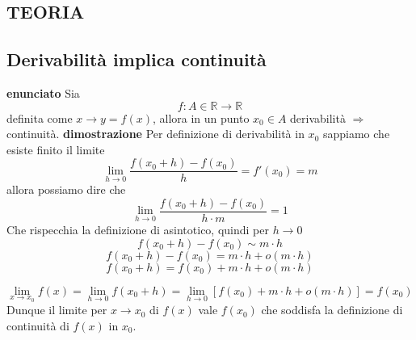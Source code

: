 \documentclass[a4paper, 9pt]{report}
\begin{document}
\newpage
\subsection*{TEORIA}
\subsection*{Derivabilità implica continuità}
\textbf{enunciato}\newline
Sia
\[
    f: A \in \mathbb{R} \rightarrow  \mathbb{R}
\]
definita come $x \longrightarrow y = f(x)$, allora in un punto $x_0 \in A$ derivabilità $\Rightarrow $ continuità. \newline
\textbf{dimostrazione}\newline
Per definizione di derivabilità in $x_0$ sappiamo che esiste finito il limite
\[
    \lim_{h\rightarrow 0}\frac{f(x_0 +h)- f(x_0)}{h} = f'(x_0) = m
\]
allora possiamo dire che
\[
    \lim_{h\rightarrow 0} \frac{f(x_0 + h) - f(x_0)}{h \cdot m} = 1
\]
Che rispecchia la definizione di asintotico, quindi per $h \rightarrow  0$
\[
    f(x_0+h) - f(x_0) \sim m \cdot h
\]
\[
    f(x_0 + h ) - f(x_0) = m \cdot h  + o(m \cdot h)
\]
\[
    f(x_0 + h) = f(x_0) + m \cdot h + o(m \cdot h)
\]

\[
    \lim_{x\rightarrow x_0} f(x) = \lim_{h\rightarrow 0} f(x_0 +h) = \lim_{h \rightarrow 0}[f(x_0) + m \cdot h + o(m \cdot h)] = f(x_0)
\]
Dunque il limite per $x \rightarrow x_0$ di $f(x)$ vale $f(x_0)$ che soddisfa la definizione di continuità di $f(x)$ in $x_0$.







\newpage
\end{document}
